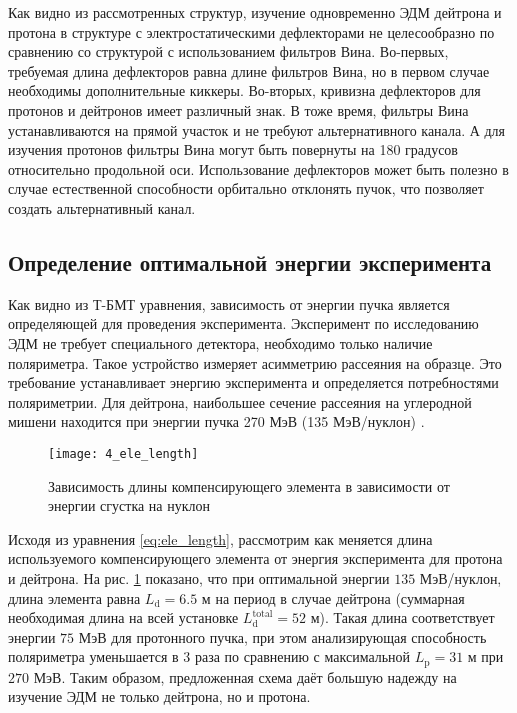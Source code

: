 \par  Как видно из рассмотренных структур, изучение одновременно ЭДМ дейтрона и протона в структуре с электростатическими дефлекторами не целесообразно по сравнению со структурой с использованием фильтров Вина. Во-первых, требуемая длина дефлекторов равна длине фильтров Вина, но в первом случае необходимы дополнительные киккеры. Во-вторых, кривизна дефлекторов для протонов и дейтронов имеет различный знак. В тоже время, фильтры Вина устанавливаются на прямой участок и не требуют альтернативного канала. А для изучения протонов фильтры Вина могут быть повернуты на 180 градусов относительно продольной оси. Использование дефлекторов может быть полезно в случае естественной способности орбитально отклонять пучок, что позволяет создать альтернативный канал.

	\subsection{Определение оптимальной энергии эксперимента}\label{sec:EDM/requirements/energy}
\par Как видно из Т-БМТ уравнения, зависимость от энергии пучка является определяющей для проведения эксперимента.  Эксперимент по исследованию ЭДМ не требует специального детектора, необходимо только наличие поляриметра. Такое устройство измеряет асимметрию рассеяния на образце. Это требование устанавливает энергию эксперимента и определяется потребностями поляриметрии. Для дейтрона, наибольшее сечение рассеяния на углеродной мишени находится при энергии пучка 270 МэВ (135 МэВ/нуклон) \cite{JEDI:polarimeter, skhomenko:polarimeter}.

\begin{figure}[!h]
  \centering
	\texttt{[image: 4\_ele\_length]}
   \caption{Зависимость длины компенсирующего элемента в зависимости от энергии сгустка на нуклон}
   \label{fig:4_ele_length}
\end{figure}

\par Исходя из уравнения \ref{eq:ele_length}, рассмотрим как меняется длина используемого компенсирующего элемента от энергия эксперимента для протона и дейтрона. На рис. \ref{fig:4_ele_length} показано, что при оптимальной энергии $135$ МэВ/нуклон, длина элемента равна $L_{\textrm{d}} = 6.5$ м на период в случае дейтрона (суммарная необходимая длина на всей установке $L^{\textrm{total}}_{\textrm{d}} = 52$ м). Такая длина соответствует энергии $75$ МэВ для протонного пучка, при этом анализирующая способность поляриметра уменьшается в 3 раза \cite{mcnaughton:polarimeter} по сравнению с максимальной $L_{\textrm{p}} = 31$ м при $270$ МэВ. Таким образом, предложенная схема даёт большую надежду на изучение ЭДМ не только дейтрона, но и протона.
	

